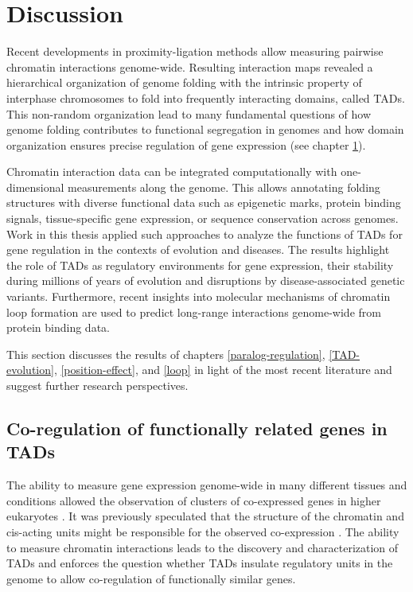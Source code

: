 \documentclass[a4paper,twoside=true,openright,parskip=full,chapterprefix=true,11pt,headings=normal,bibliography=totoc,listof=totoc,titlepage=on,captions=tableabove,draft=false]{scrreprt}
\theoremstyle{definition}
\theoremstyle{definition}
\theoremstyle{definition}
\theoremstyle{remark}
\begin{document}
\hypertarget{thesis-discussion}{%
\chapter{Discussion}\label{thesis-discussion}}

Recent developments in proximity-ligation methods allow measuring
pairwise chromatin interactions genome-wide. Resulting interaction maps
revealed a hierarchical organization of genome folding with the
intrinsic property of interphase chromosomes to fold into frequently
interacting domains, called TADs. This non-random organization lead to
many fundamental questions of how genome folding contributes to
functional segregation in genomes and how domain organization ensures
precise regulation of gene expression (see chapter
\protect\hyperlink{intro}{1}).

Chromatin interaction data can be integrated computationally with
one-dimensional measurements along the genome. This allows annotating
folding structures with diverse functional data such as epigenetic
marks, protein binding signals, tissue-specific gene expression, or
sequence conservation across genomes. Work in this thesis applied such
approaches to analyze the functions of TADs for gene regulation in the
contexts of evolution and diseases. The results highlight the role of
TADs as regulatory environments for gene expression, their stability
during millions of years of evolution and disruptions by
disease-associated genetic variants. Furthermore, recent insights into
molecular mechanisms of chromatin loop formation are used to predict
long-range interactions genome-wide from protein binding data.

This section discusses the results of chapters \ref{paralog-regulation},
\ref{TAD-evolution}, \ref{position-effect}, and \ref{loop} in light of
the most recent literature and suggest further research perspectives.

\hypertarget{co-regulation-of-functionally-related-genes-in-tads}{%
\section{Co-regulation of functionally related genes in
TADs}\label{co-regulation-of-functionally-related-genes-in-tads}}

The ability to measure gene expression genome-wide in many different
tissues and conditions allowed the observation of clusters of
co-expressed genes in higher eukaryotes
\citep{Boutanaev2002, Purmann2007}. It was previously speculated that
the structure of the chromatin and cis-acting units might be responsible
for the observed co-expression \citep{Sproul2005, Purmann2007}. The
ability to measure chromatin interactions leads to the discovery and
characterization of TADs and enforces the question whether TADs insulate
regulatory units in the genome to allow co-regulation of functionally
similar genes.
\end{document}
